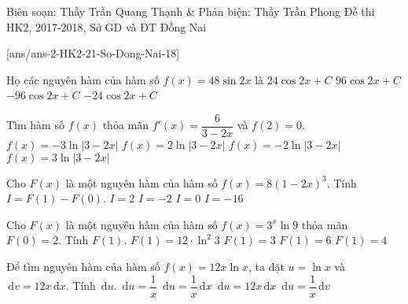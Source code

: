 \begin{name}
{Biên soạn: Thầy Trần Quang Thạnh \& Phản biện: Thầy Trần Phong}
{Đề thi HK2, 2017-2018, Sở GD và ĐT Đồng Nai}
\end{name}
\setcounter{ex}{0}\setcounter{bt}{0}
[ans/ans-2-HK2-21-So-Dong-Nai-18]
\begin{ex}%
	Họ các nguyên hàm của hàm số $f(x)=48\sin2x$ là
	\choice
	{$24\cos2x+C $}
	{$96\cos2x+C $}
	{$-96\cos2x+C $}
	{\True $-24\cos2x+C $}
\end{ex} 

\begin{ex}%
	Tìm hàm số $f(x)$ thỏa mãn $f'(x)=\dfrac{6}{3-2x}$ và $f(2)=0$.
	\choice
	{\True $f(x)=-3\ln|3-2x| $}
	{$f(x)=2\ln|3-2x| $}
	{$f(x)=-2\ln|3-2x| $}
	{$f(x)=3\ln|3-2x| $}
\end{ex}

\begin{ex}%
	Cho $F(x)$ là một nguyên hàm của hàm số $f(x)=8(1-2x)^3$. Tính $I=F(1)-F(0)$.
	\choice
	{$I=2 $}
	{$I=-2 $}
	{\True $I=0 $}
	{$I=-16 $}
\end{ex}

\begin{ex}%
	Cho $F(x)$ là một nguyên hàm của hàm số $f(x)=3^x\ln9$ thỏa mãn $F(0)=2$. Tính $F(1)$.
	\choice
	{$F(1)=12\cdot \ln^2{3} $}
	{$F(1)=3 $}
	{\True $F(1)=6 $}
	{$F(1)=4 $}
\end{ex}

\begin{ex}%
	Để tìm nguyên hàm của hàm số $f(x)=12x\ln x$, ta đặt $u=\ln x$ và $\mathrm{\,d}v=12x\mathrm{\,d}x$. Tính $\mathrm{\,d}u$.
	\choice
	{$\mathrm{\,d}u=\dfrac{1}{x} $}
	{\True $\mathrm{\,d}u=\dfrac{1}{x}\mathrm{\,d}x $}
	{$\mathrm{\,d}u=12x\mathrm{\,d}x $}
	{$\mathrm{\,d}u=\dfrac{1}{x}\mathrm{\,d}v $}
\end{ex}

